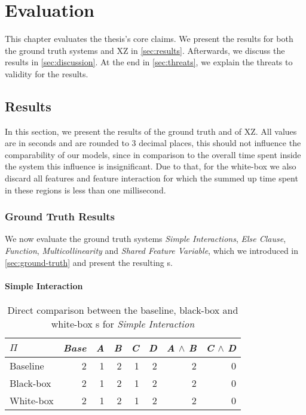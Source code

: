 \chapter{Evaluation}\label{ch:evaluation}
\lstset{style=myStyle}

This chapter evaluates the thesis's core claims.  
We present the results for both the ground truth systems and \textsc{XZ} in \autoref{sec:results}.
Afterwards, we discuss the results in \autoref{sec:discussion}. At the end in \autoref{sec:threats}, we explain the threats to validity for the results.

\section{Results}\label{sec:results}

In this section, we present the results of the ground truth and of \textsc{XZ}. 
All values are in seconds and are rounded to 3 decimal places, this should not influence the comparability of our models, since in comparison
to the overall time spent inside the system this influence is insignificant. Due to that, for the white-box we also discard all features
and feature interaction for which the summed up time spent in these regions is less than one millisecond.

\subsection{Ground Truth Results}
We now evaluate the ground truth systems \emph{Simple Interactions}, \emph{Else Clause}, \emph{Function}, \emph{Multicollinearity} 
and \emph{Shared Feature Variable}, which we introduced in \autoref{sec:ground-truth} and present the resulting {\perfInfluenceModel}s.

\subsubsection*{Simple Interaction}

\begin{table}[H]
    \centering
    \begin{tabular}{lrrrrrrr}
    \toprule
    $\Pi$    & \emph{Base} & \emph{A} & \emph{B} & \emph{C} & \emph{D} & \emph{A} $\land$ \emph{B} & \emph{C} $\land$ \emph{D}  \\ \midrule
    Baseline & 2    & 1 & 2 & 1 & 2 & 2           & 0            \\
    Black-box & 2    & 1 & 2 & 1 & 2 & 2           & 0           \\
    White-box & 2    & 1 & 2 & 1 & 2 & 2           & 0           \\ \bottomrule
    \end{tabular}  
    \caption{Direct comparison between the baseline, black-box and white-box {\perfInfluenceModel}s for \emph{Simple Interaction}}\label{aggr:results-simple-interaction}
\end{table}

